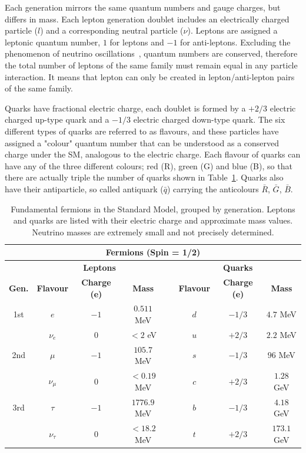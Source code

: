 \documentclass[11pt,twoside]{book}
\begin{document}
Each generation mirrors the same quantum numbers and gauge charges, but differs in mass. Each lepton generation doublet includes an electrically charged particle ($l$) and a corresponding neutral particle ($\nu$). Leptons are assigned a leptonic quantum number, $1$ for leptons and $-1$ for anti-leptons. Excluding the phenomenon of neutrino oscillations~\cite{neutrino1,neutrino2}, quantum numbers are conserved, therefore the total number of leptons of the same family must remain equal in any particle interaction. It means that lepton can only be created in lepton/anti-lepton pairs of the same family. 

Quarks have fractional electric charge, each doublet is formed by a $+2/3$ electric charged up-type quark and a $−1/3$ electric charged down-type quark. The six different types of quarks are referred to as flavours, and these particles have assigned a "colour" quantum number that can be understood as a conserved charge under the \acrshort{SM}, analogous to the electric charge. Each flavour of quarks can have any of the three different colours;
red (R), green (G) and blue (B), so that there are actually triple the number of quarks
shown in Table~\ref{tab:fermions}. Quarks also have their antiparticle, so called antiquark ($\bar{q}$) carrying
the anticolours $\bar{R}$, $\bar{G}$, $\bar{B}$.
\begin{table}[htbp]
\centering
\small %
\renewcommand{\arraystretch}{1.2} %
\setlength{\tabcolsep}{4pt} %
\begin{tabular}{cccccccc}
\multicolumn{8}{c}{\textbf{Fermions (Spin = 1/2)}} \\
\toprule
 & \multicolumn{3}{c}{\textbf{Leptons}} & & \multicolumn{3}{c}{\textbf{Quarks}} \\
\midrule
\textbf{Gen.} & \textbf{Flavour} & \textbf{Charge (e)} & \textbf{Mass} & 
              & \textbf{Flavour} & \textbf{Charge (e)} & \textbf{Mass} \\
\midrule
1st & $e$ & $-1$ & $0.511$ MeV & & $d$ & $-1/3$ & $4.7$ MeV \\
    & $\nu_e$ & $0$ & $<2$ eV & & $u$ & $+2/3$ & $2.2$ MeV \\
2nd & $\mu$ & $-1$ & $105.7$ MeV & & $s$ & $-1/3$ & $96$ MeV \\
     & $\nu_\mu$ & $0$ & $<0.19$ MeV & & $c$ & $+2/3$ & $1.28$ GeV \\
3rd & $\tau$ & $-1$ & $1776.9$ MeV & & $b$ & $-1/3$ & $4.18$ GeV \\
     & $\nu_\tau$ & $0$ & $<18.2$ MeV & & $t$ & $+2/3$ & $173.1$ GeV \\
\bottomrule
\end{tabular}
\caption{Fundamental fermions in the Standard Model, grouped by generation. Leptons and quarks are listed with their electric charge and approximate mass values. Neutrino masses are extremely small and not precisely determined.}
\label{tab:fermions}
\end{table}
\end{document}
